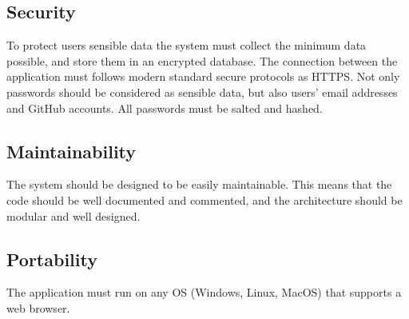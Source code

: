 \subsection{Security}
To protect users sensible data the system must collect the minimum data possible, and store them in an
encrypted database. The connection between the application must follows modern standard secure protocols as
HTTPS. Not only passwords should be considered as sensible data, but also users' email addresses and GitHub accounts. 
All passwords must be salted and hashed.

\subsection{Maintainability}
The system should be designed to be easily maintainable. This means that the code should be well documented 
and commented, and the architecture should be modular and well designed.

\subsection{Portability}
The application must run on any OS (Windows, Linux, MacOS) that supports a web browser.